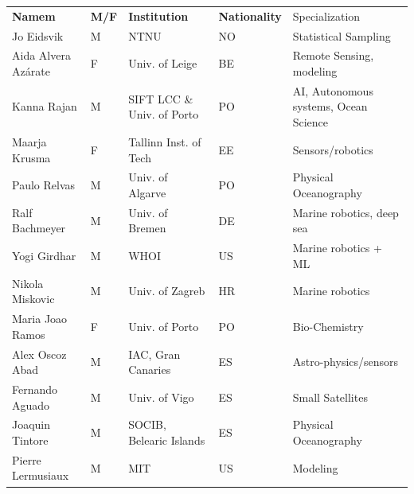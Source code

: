 \begin{table}[H]
  \footnotesize{
\begin{tabular}{|p{3cm}|p{0.5cm}|p{3.5cm}|p{0.5cm}|p{6cm}|}
  \rowcolor{Gray}
  \bfseries Namem& \bfseries M/F&\bfseries Institution & \bfseries Nationality& Specialization\\
Jo Eidsvik               & M   & NTNU                                  & NO       & Statistical Sampling                            \\
\hline
Aida Alvera Az\'{a}rate    & F   & Univ. of Leige                        & BE       & Remote Sensing, modeling                        \\
\hline
Kanna Rajan              & M   & SIFT LCC \& Univ. of Porto            & PO       & AI, Autonomous systems, Ocean Science           \\
 \hline
Maarja Krusma            & F   & Tallinn Inst. of Tech                 & EE  & Sensors/robotics                                \\
  \hline
Paulo Relvas             & M   & Univ. of Algarve                      & PO       & Physical Oceanography                           \\
\hline
Ralf Bachmeyer           & M   & Univ. of Bremen                       & DE       & Marine robotics, deep sea                       \\
\hline
Yogi Girdhar             & M   & WHOI                                  & US       & Marine robotics + ML                            \\
\hline
Nikola Miskovic          & M   & Univ. of Zagreb                       & HR  & Marine robotics                                 \\
\hline
Maria Joao Ramos         & F   & Univ. of Porto                        & PO       & Bio-Chemistry                                   \\
\hline
Alex Oscoz Abad          & M   & IAC, Gran Canaries                    & ES       & Astro-physics/sensors                           \\
\hline
Fernando Aguado          & M   & Univ. of Vigo                         & ES       & Small Satellites                                \\
\hline
Joaquin Tintore          & M   & SOCIB, Belearic Islands               & ES       & Physical Oceanography                           \\
\hline
Pierre Lermusiaux        & M   & MIT                                   & US       & Modeling                                        \\

\end{tabular}}
\end{table}
